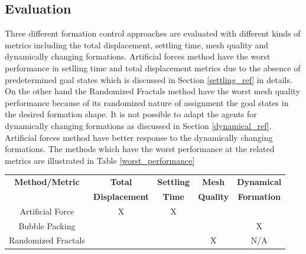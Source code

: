 \subsection{Evaluation} \label{evaluation_ref}
Three different formation control approaches are evaluated with different kinds of metrics including the total displacement, settling time, mesh quality and dynamically changing formations. Artificial forces method have the worst performance in setlling time and total displacement metrics due to the absence of predetermined goal states which is discussed in Section \ref{settling_ref} in details. On the other hand the Randomized Fractals method have the worst mesh quality performance because of its randomized nature of assignment the goal states in the desired formation shape. It is not possible to adapt the agents for dynamically changing formations as discussed in Section \ref{dynamical_ref}. Artificial forces method have better response to the dynamically changing formations. The methods which have the worst performance at the related metrics are illustrated in Table \ref{worst_performance}
		
\begin{center}
 \label{worst_performance} 
\begin{tabular}{||c| c| c | c | c||}
				
\hline
\textbf{Method/Metric} & \textbf{Total}  & \textbf{Settling} & \textbf{Mesh} & \textbf{Dynamical}\\ 
                       & \textbf{Displacement}  & \textbf{Time} & \textbf{Quality} & \textbf{Formation}\\
\hline
Artificial Force & X & X & & \\
Bubble Packing & &  & & X\\	
Randomized Fractals & &  & X & N/A \\	
\hline
\end{tabular}
\end{center}
		

